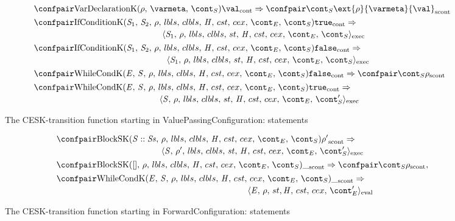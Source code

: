 \documentclass[a4paper,oneside]{article}
\newcommand{\cesktrans}[2]{\ensuremath{{#1} \Rightarrow {#2}}}
\newcommand{\cesktranssplit}[2]{\ensuremath{{#1} \Rightarrow\\ {#2}}}
\begin{document}
\begin{figure}
    \begin{align}
       &\cesktrans%
           {\contconf{\VarDeclK{\env}{\varmeta}{\scont}}{\val}}%
           {\scontconf{\scont}{\ext{\env}{\varmeta}{\val}}}
       \label{econtconf:vardecl}\\
       &\begin{multlined}
           \cesktranssplit%
                {\contconf{\IfCondK{\stmti{1}}{\stmti{2}}}{\true}}%
                {\execconf{\stmti{1}}{\env}{\lbls}{\clbls}{\handler}{\cstrace}{\cex}{\econt}{\scont}}
       \end{multlined}
       \label{econtconf:if-true}\\
       &\begin{multlined}
           \cesktranssplit%
                {\contconf{\IfCondK{\stmti{1}}{\stmti{2}}}{\false}}%
                {\execconf{\stmti{1}}{\env}{\lbls}{\clbls}{\handler}{\cstrace}{\cex}{\econt}{\scont}}
       \end{multlined}
       \label{econtconf:if-false}\\
       &\begin{multlined}
              \cesktrans%
                  {\contconf{\WhileCondK}{\false}}%
                  {\scontconf{\scont}{\env}}
       \end{multlined}
       \label{econtconf:while-false}\\
       &\begin{multlined}
              \cesktranssplit%
                  {\contconf{\WhileCondK}{\true}}%
                  {\execconf{\stmt}{\env}{\lbls}{\clbls}{\handler}{\cstrace}{\cex}{\econt}{\scont'}}
       \end{multlined}
       \label{econtconf:while-true}
       \end{align}
       \caption{The CESK-transition function starting in ValuePassingConfiguration: statements}
\end{figure}
\begin{figure}
    \begin{align}
       &\begin{multlined}
        \cesktranssplit%
          {\scontconf{\BlockSK{\stmt :: \stmts}{\env}}{\env'}}
          {\execconf{\stmt}{\env'}{\lbls}{\clbls}{\handler}{\cstrace}{\cex}{\econt}{\scont'}}
    \end{multlined}
    \label{scontconf:block}\\
    &\cesktrans%
      {\scontconf{\BlockSK{[]}{\env}}{ \_ }}%
      {\scontconf{\scont}{\env}},
    \label{scontconf:block-empty}\\
    &\begin{multlined}
           \cesktranssplit%
               {\scontconf{\WhileCondK}{\_}}%
               {\evalconf{\expr}{\env}{\strace}{\cstrace}{\cex}{\econt'}}
    \end{multlined}
    \label{scontconf:while}
    \end{align}
    \caption{The CESK-transition function starting in ForwardConfiguration: statements}
\end{figure}
\end{document}
